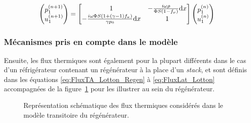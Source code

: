 \begin{equation}
	\begin{pmatrix}
	p_1^{(n+1)}\\
	u_1^{(n+1)}
	\end{pmatrix}=\begin{bmatrix}
	1 & -\frac{i\omega\rho}{\Phi S(1-f_\nu)}\mathrm{d} x\\
	-\frac{i\omega\Phi S \left(1 + (\gamma-1)f_\kappa\right)}{\gamma p_0}\mathrm{d} x & 1
	\end{bmatrix}\begin{pmatrix}
	p_1^{(n)}\\
	u_1^{(n)}
	\end{pmatrix}
\end{equation}

\subsubsection{Mécanismes pris en compte dans le modèle}
Ensuite, les flux thermiques sont également pour la plupart différents dans le cas d'un réfrigérateur contenant un régénérateur à la place d'un \textit{stack}, et sont définis dans les équations \eqref{eq:FluxTA_Lotton_Regen} à \eqref{eq:FluxLat_Lotton} accompagnées de la figure~\ref{fig:Schema_FluxThermiquesNoyau_Gaelle} pour les illustrer au sein du régénérateur.

\begin{figure}[!ht]
    \centering
    
    \caption{Représentation schématique des flux thermiques considérés dans le modèle transitoire du régénérateur.}
    \label{fig:Schema_FluxThermiquesNoyau_Gaelle}
\end{figure}

